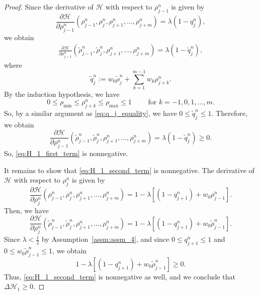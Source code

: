 \begin{proof}
    Since the derivative of $\mathcal{H}$ with respect to $\rho_{j-1}^n$ is given by
    \[
        \frac{\partial \mathcal{H}}{\partial \rho_{j-1}^n}(\rho_{j-1}^n, \rho_{j}^n, \rho_{j+1}^n, \dots, \rho_{j+m}^n)
        =\lambda(1-q_j^n),
    \]
    we obtain
    \begin{align*}
        \frac{\partial \mathcal{H}}{\partial \rho_{j-1}^n} ( \tilde{\rho}_{j-1}^n, \tilde{\rho}_{j}^n, \rho_{j+1}^n, \dots, \rho_{j+m}^n) = \lambda(1- \tilde{q}_j^n),
    \end{align*}
    where
    \[
        \tilde{q}_j^n := w_0 \tilde{\rho}_{j}^n+ \sum_{k=1}^{m-1} w_k \rho_{j+k}^n.
    \]
    By the induction hypothesis, we have
    \[
        0 \leq \rho_{\min} \leq  \rho_{j+k}^{n} \leq \rho_{\max} \leq 1 \qquad \text{ for } k = -1, 0,1,\dots,m.
    \] So, by a similar argument as \eqref{eq:q_j_equality}, we have $0 \leq \tilde{q}_j^n \leq 1$. Therefore, we obtain
    \[\frac{\partial \mathcal{H}}{\partial \rho_{j-1}^n} ( \tilde{\rho}_{j-1}^n, \tilde{\rho}_{j}^n, \rho_{j+1}^n, \dots, \rho_{j+m}^n) = \lambda(1- \tilde{q}_j^n) \geq 0.\]
    So, \eqref{eq:H_1_first_term} is nonnegative.

    It remains to show that \eqref{eq:H_1_second_term} is nonnegative. The derivative of $\mathcal{H}$ with respect to $\rho_{j}^n$ is given by
    \[
        \frac{\partial \mathcal{H}}{\partial \rho_{j}^n}(\rho_{j-1}^n, \rho_{j}^n, \rho_{j+1}^n, \dots, \rho_{j+m}^n)
        = 1-\lambda\left[(1-q_{j+1}^n)+w_0\rho_{j-1}^n\right].
    \]
    Then, we have
    \[
        \frac{\partial \mathcal{H}}{\partial \rho_{j}^n} ( \tilde{\rho}_{j-1}^n, \tilde{\rho}_{j}^n, \rho_{j+1}^n, \dots, \rho_{j+m}^n) =
        1-\lambda\left[(1-q_{j+1}^n)+w_0 \tilde{\rho}_{j-1}^n\right].\]
    Since $\lambda < \frac{1}{2}$ by Assumption~\ref{assm:assm_4}, and since $0\leq q_{j+1}^n \leq 1$ and $0 \leq w_0 \tilde{\rho}_{j-1}^n \leq 1$, we obtain
    \[1-\lambda\left[(1-q_{j+1}^n)+w_0 \tilde{\rho}_{j-1}^n\right]\geq 0.\]
    Thus, \eqref{eq:H_1_second_term} is nonnegative as well, and we conclude that $\Delta \mathcal{H}_1 \geq 0$.


\end{proof}
